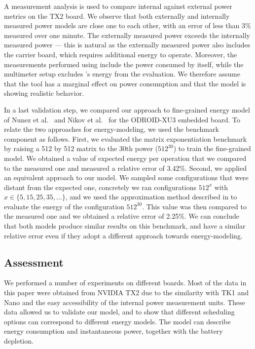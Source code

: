 A %
measurement analysis is used to compare internal against external power metrics on the TX2 board. We observe that both externally and internally measured power models are close one to each other, with an error of less than 3\% measured over one minute. The externally measured power exceeds the internally measured power --- this is natural as the externally measured power also includes the carrier board, which requires additional energy to operate. Moreover, the measurements performed using \powprof{} include the power consumed by \powprof{} itself, while the multimeter setup excludes \powprof{}'s energy from the evaluation. We therefore assume that the tool has a marginal effect on power consumption and that the model is showing realistic behavior.

In a last validation step, we compared our approach to fine-grained energy model of Nunez et al.~\citep{nunez2013enabling} and Nikov et al.~\citep{nikov2015evaluation} for the ODROID-XU3 embedded board. To relate the two approaches for energy-modeling, we used the  benchmark component as follows. First, we evaluated the matrix exponentiation benchmark by raising a 512 by 512 matrix to the 30th power ($512^{30}$) to train the fine-grained model. We obtained a value of expected energy per operation that we compared to the measured one and measured a relative error of 3.42\%. Second, we applied an equivalent approach to our model. We sampled some configurations that were distant from the expected one, concretely we ran configurations $512^{x}$ with $x\in \{5,15,25,35,\dots\}$, and we used the approximation method described in  to evaluate the energy of the configuration $512^{30}$. This value was then compared to the measured one and we obtained a relative error of 2.25\%. We can conclude that both models produce similar results on this benchmark, and have a similar relative error even if they adopt a different approach towards energy-modeling.

\subsection{\color{cyan}Assessment}
\label{sec:experimental-results:assessment}

We performed a number of experiments on different boards. Most of the data in this paper were obtained from NVIDIA TX2 due to the similarity with TK1 and Nano and the easy accessibility of the internal power measurement units. These data allowed us to validate our model, and to show that different scheduling options can correspond to different energy models. The model can describe energy consumption and instantaneous power, together with the battery depletion.

